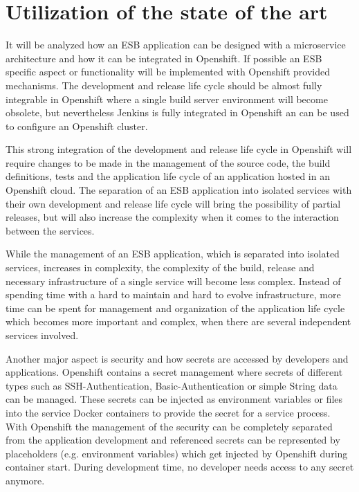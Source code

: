 \section{Utilization of the state of the art}
\label{sec:deduction}
It will be analyzed how an ESB application can be designed with a microservice architecture and how it can be integrated in Openshift. If possible an ESB specific aspect or functionality will be implemented with Openshift provided mechanisms. The development and release life cycle should be almost fully integrable in Openshift where a single build server environment will become obsolete, but nevertheless Jenkins is fully integrated in Openshift an can be used to configure an Openshift cluster.

This strong integration of the development and release life cycle in Openshift will require changes to be made in the management of the source code, the build definitions, tests and the application life cycle of an application hosted in an Openshift cloud. The separation of an ESB application into isolated services with their own development and release life cycle will bring the possibility of partial releases, but will also increase the complexity when it comes to the interaction between the services.

While the management of an ESB application, which is separated into isolated services, increases in complexity, the complexity of the build, release and necessary infrastructure  of a single service will become less complex. Instead of spending time with a hard to maintain and hard to evolve infrastructure, more time can be spent for management and organization of the application life cycle which becomes more important and complex, when there are several independent services involved.

Another major aspect is security and how secrets are accessed by developers and applications. Openshift contains a secret management where secrets of different types such as SSH-Authentication, Basic-Authentication or simple String data can be managed. These secrets can be injected as environment variables or files into the service Docker containers to provide the secret for a service process. With Openshift the management of the security can be completely separated from the application development and referenced secrets can be represented by placeholders (e.g. environment variables) which get injected by Openshift during container start. During development time, no developer needs access to any secret anymore.